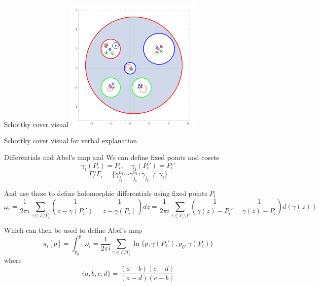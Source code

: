 \documentclass[11pt,aspectratio=169]{beamer}
\begin{document}
\begin{frame}[noframenumbering]{Schottky cover visual}{\tiny \cite{Cha22}}
    \center{}
    \includegraphics[width=0.5\textwidth]{assets/ChanSchottkyCover2.png}

    \tiny Schottky cover visual for verbal explanation

    \cite{Cha22}
\end{frame}

\begin{frame}{Differentials and Abel's map}{\tiny \cite{ComputationalSchottky} and \cite{Cha22}}
    We can define fixed points and cosets
    \[\gamma_i(P_i)=P_i, \quad \gamma_i(P_i')=P_i'\]
    \[\Gamma / \Gamma_i = \{\gamma_{j_1}^{n_1}\cdots \gamma_{j_k}^{n_k}: \gamma_{j_k} \neq \gamma_i\}\]
    
    \pause{}
    
    And use these to define holomorphic differentials using fixed points $P_i$
    \[\omega_i = \frac{1}{2\pi i}\sum_{\gamma \in \Gamma / \Gamma_i} \left(\frac{1}{z-\gamma(P_i')} - \frac{1}{z-\gamma(P_i)}\right)dz = \frac{1}{2\pi i}\sum_{\gamma \in \Gamma_i \setminus \Gamma } \left(\frac{1}{\gamma(z)-P_i'} - \frac{1}{\gamma(z)-P_i}\right)d(\gamma(z))\]
    
    \pause{}
    
    Which can then be used to define Abel's map
    \[u_i[p] = \int_{p_0}^p \omega_i = \frac{1}{2\pi i} \sum_{\gamma \in \Gamma/\Gamma_i} \ln \{p,\gamma(P_i'),p_0,\gamma(P_i)\}\]
    where
    \[\{a,b,c,d\} = \frac{(a-b)(c-d)}{(a-d)(c-b)}\]
\end{frame}
\end{document}
